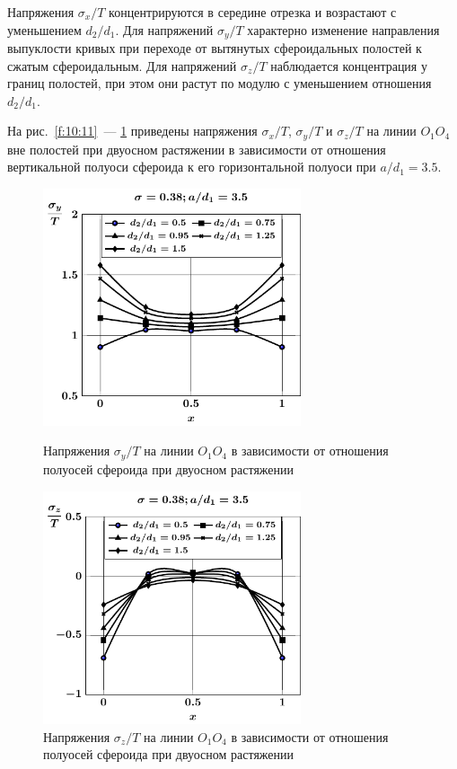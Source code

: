 Напряжения $\sigma_x/T$ концентрируются в середине отрезка и возрастают с уменьшением $d_2/d_1$. Для напряжений $\sigma_y/T$ характерно изменение направления выпуклости кривых при переходе от вытянутых сфероидальных полостей к сжатым сфероидальным. Для напряжений $\sigma_z/T$ наблюдается концентрация у границ полостей, при этом они растут по модулю с уменьшением отношения $d_2/d_1$.

На рис.~\ref{f:10:11}~--- \ref{f:10:13} приведены напряжения $\sigma_x/T$, $\sigma_y/T$ и $\sigma_z/T$ на линии $O_1O_4$ вне полостей при двуосном растяжении в зависимости от отношения вертикальной полуоси сфероида к его горизонтальной полуоси при $a/d_1=3.5$.

\begin{figure}[h!]
\centering\footnotesize
\parbox[b]{7.5cm}{\centering\includegraphics[width=7.6cm]{cav4-prolate-oblate-a35-t2-sig_y.pdf}
\caption{Напряжения $\sigma_y/T$ на линии $O_1O_4$ в зависимости от отношения полуосей сфероида при двуосном растяжении
\label{f:10:12}}}\hfil\hfil
\parbox[b]{7.5cm}{\centering\includegraphics[width=7.6cm]{cav4-prolate-oblate-a35-t2-sig_z.pdf}
\caption{Напряжения $\sigma_z/T$ на линии $O_1O_4$ в зависимости от отношения полуосей сфероида при двуосном растяжении
\label{f:10:13}}}
\end{figure}

